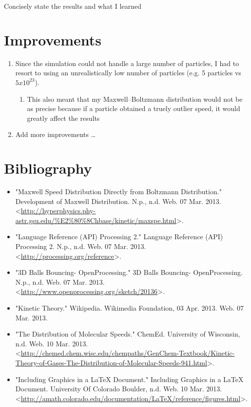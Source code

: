 \documentclass[]{article}
\begin{document}
Concisely state the results and what I learned

\section{Improvements}

\begin{enumerate}
\item
  Since the simulation could not handle a large number of particles, I
  had to resort to using an unrealistically low number of particles
  (e.g. 5 particles vs $5 x 10^{23}$).

  \begin{enumerate}
  \item
    This also meant that my Maxwell--Boltzmann distribution would not be
    as precise because if a particle obtained a truely outlier speed, it
    would greatly affect the results
  \end{enumerate}
\item
  Add more improvements \ldots{}
\end{enumerate}
\section{Bibliography}

\begin{itemize}
\item
  "Maxwell Speed Distribution Directly from Boltzmann Distribution."
  Development of Maxwell Distribution. N.p., n.d. Web. 07 Mar.
  2013.\textless{}\url{http://hyperphysics.phy-astr.gsu.edu/%E2%80%8Chbase/kinetic/maxspe.html}\textgreater{}.
\item
  "Language Reference (API) Processing 2." Language Reference (API)
  Processing 2. N.p., n.d. Web. 07 Mar. 2013.
  \textless{}\url{http://processing.org/reference}\textgreater{}.
\item
  "3D Balls Bouncing- OpenProcessing." 3D Balls Bouncing-
  OpenProcessing. N.p., n.d. Web. 07 Mar. 2013.
  \textless{}\url{http://www.openprocessing.org/sketch/20136}\textgreater{}.
\item
  "Kinetic Theory." Wikipedia. Wikimedia Foundation, 03 Apr. 2013. Web.
  07 Mar. 2013.
\item
  "The Distribution of Molecular Speeds." ChemEd. University of
  Wisconsin, n.d. Web. 10 Mar. 2013.
  \textless{}\url{http://chemed.chem.wisc.edu/chempaths/GenChem-Textbook/Kinetic-Theory-of-Gases-The-Distribution-of-Molecular-Speeds-941.html}\textgreater{}.
\item
  "Including Graphics in a LaTeX Document." Including Graphics in a
  LaTeX Document. University Of Colorado Boulder, n.d. Web. 10 Mar.
  2013.
  \textless{}\url{http://amath.colorado.edu/documentation/LaTeX/reference/figures.html}\textgreater{}.
\end{itemize}
\end{document}
